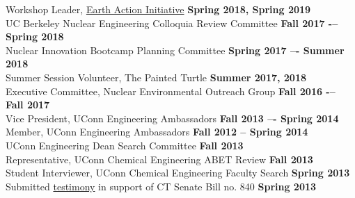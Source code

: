 \documentclass[margin,line]{resume}
\begin{document}
\begin{resume}
Workshop Leader, \href{https://www.earthactioninitiative.org/}{Earth Action Initiative}
    \hfill \textbf{Spring 2018, Spring 2019} \\
UC Berkeley Nuclear Engineering Colloquia Review Committee 
    \hfill \textbf{Fall 2017 -– Spring 2018} \\
Nuclear Innovation Bootcamp Planning Committee	
    \hfill \textbf{Spring 2017 –- Summer 2018} \\
Summer Session Volunteer, The Painted Turtle
    \hfill \textbf{Summer 2017, 2018} \\
Executive Committee, Nuclear Environmental Outreach Group
    \hfill \textbf{Fall 2016 -– Fall 2017} \\
Vice President, UConn Engineering Ambassadors
    \hfill \textbf{Fall 2013 –- Spring 2014} \\
Member, UConn Engineering Ambassadors
    \hfill \textbf{Fall 2012 – Spring 2014} \\
UConn Engineering Dean Search Committee
    \hfill \textbf{Fall 2013} \\
Representative, UConn Chemical Engineering ABET Review
    \hfill \textbf{Fall 2013} \\
Student Interviewer, UConn Chemical Engineering Faculty Search
    \hfill \textbf{Spring 2013} \\
Submitted \href{https://www.cga.ct.gov/2013/FINdata/Tmy/2013SB-00840-R000304-Milos\%20Atz,\%20Student,\%20UConn-TMY.PDF}{testimony} in support of CT Senate Bill no. 840
    \hfill \textbf{Spring 2013} \\ %




\end{resume}
\end{document}
